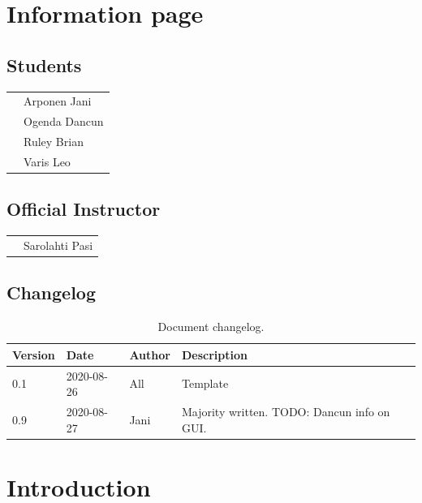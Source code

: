\section{Information page}
\subsection*{Students}
\begin{tabular}{ll}
   & Arponen Jani \\
   & Ogenda Dancun \\
   & Ruley Brian \\
   & Varis Leo \\
\end{tabular}

\subsection*{Official Instructor}
\begin{tabular}{ll}
   & Sarolahti Pasi \\
\end{tabular}



\subsection*{Changelog}
\begin{table}[!h]
\small{
\begin{tabular}{l|l|l|l}
\textbf{Version} & \textbf{Date} & \textbf{Author} & \textbf{Description} \\
\hline
0.1 & 2020-08-26 & All & Template \\
0.9 & 2020-08-27 & Jani & Majority written. TODO: Dancun info on GUI.\\
\end{tabular}
}
\caption{Document changelog.}
\label{table:changelog}
\end{table}


\newpage 
\tableofcontents

\newpage
\section{Introduction} 


